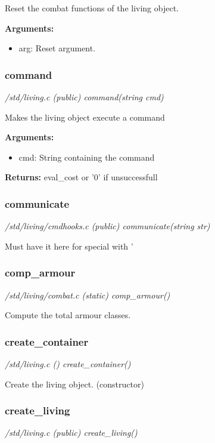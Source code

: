 Reset the combat functions of the living object.

{\bf Arguments:}
\begin{itemize}
\item     arg: Reset argument.
\end{itemize}


\subsubsection{command}

{\em /std/living.c (public) command(string cmd)}

Makes the living object execute a command

{\bf Arguments:}
\begin{itemize}
\item       cmd: String containing the command
\end{itemize}

{\bf Returns:}      eval\_cost or '0' if unsuccessfull


\subsubsection{communicate}

{\em /std/living/cmdhooks.c (public) communicate(string str)}

Must have it here for special with ' 


\subsubsection{comp\_armour}

{\em /std/living/combat.c (static) comp\_armour()}

Compute the total armour classes.


\subsubsection{create\_container}

{\em /std/living.c () create\_container()}

Create the living object. (constructor)


\subsubsection{create\_living}

{\em /std/living.c (public) create\_living()}

